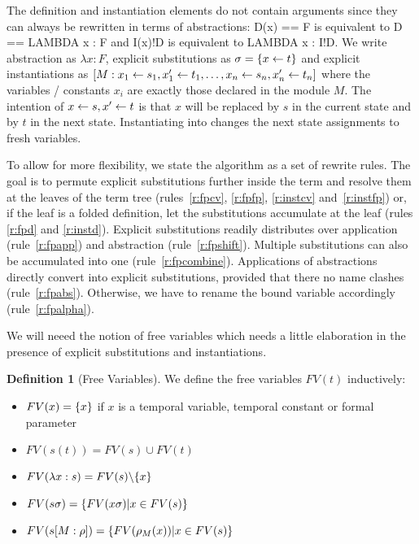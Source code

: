 \documentclass[a4paper]{article}
\theoremstyle{definition}
\newtheorem{definition}{Definition}
\begin{document}
The definition and instantiation elements do not contain arguments since they
can always be rewritten in terms of abstractions: D(x) == F is equivalent to
D == LAMBDA x : F and I(x)!D is equivalent to LAMBDA x : I!D. We write
abstraction as $\lambda x : F$, explicit substitutions as
$\sigma = \{x \leftarrow t\}$ and explicit instantiations as
$[M:x_1 \leftarrow s_1,x_1' \leftarrow t_1,\ldots,x_n \leftarrow s_n,
  x_n' \leftarrow t_n]$ where the variables / constants $x_i$ are exactly those
declared in the module $M$. The intention of $x \leftarrow s, x' \leftarrow t$ is
that $x$ will be replaced by $s$ in the current state and by $t$ in the next
 state. Instantiating into \ENABLED{} changes the next state assignments to
 fresh variables.

To allow for more flexibility, we state the algorithm as a set of rewrite
rules. The goal is to permute explicit substitutions further inside the
term and resolve them at the leaves of the term tree (rules~\ref{r:fpcv},
\ref{r:fpfp}, \ref{r:instcv} and~\ref{r:instfp}) or,
if the leaf is a folded definition, let the substitutions accumulate at the
leaf (rules \ref{r:fpd} and \ref{r:instd}). Explicit substitutions readily
distributes over application (rule~\ref{r:fpapp}) and abstraction
(rule~\ref{r:fpshift}). Multiple substitutions can also be accumulated
into one (rule~\ref{r:fpcombine}).
Applications of abstractions directly convert into explicit
substitutions, provided that there no name clashes (rule~\ref{r:fpabs}).
Otherwise, we have to rename the bound variable accordingly
(rule~\ref{r:fpalpha}).

We will neeed the notion of free variables which needs a little elaboration
 in the presence of explicit substitutions and instantiations.

 \begin{definition}[Free Variables]
   We define the free variables $FV(t)$ inductively:
   \begin{itemize}
   \item $FV(x) = \{x\}$ if $x$ is a temporal variable, temporal constant or
     formal parameter
   \item $FV(s(t)) = FV(s) \cup FV(t)$
   \item $FV(\lambda x : s) = FV(s) \backslash\{x\}$
   \item $FV(s\sigma) = \{FV(x\sigma) | x \in FV(s) \}$
   \item $FV(s[M:\rho]) = \{FV(\rho_M(x) ) | x \in FV(s)\} $
   \end{itemize}
 \end{definition}
\end{document}
